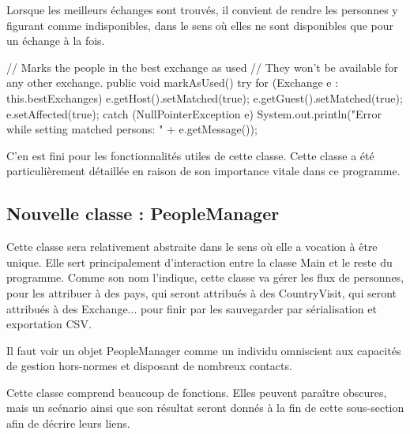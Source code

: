 \documentclass{mytex}
\begin{document}




Lorsque les meilleurs échanges sont trouvés, il convient de rendre les personnes y figurant comme indisponibles, dans le sens où elles ne sont disponibles que pour un échange à la fois.

\begin{codebox}
// Marks the people in the best exchange as used
// They won't be available for any other exchange.
public void markAsUsed() {
	try {
		for (Exchange e : this.bestExchanges) {
			e.getHost().setMatched(true);
			e.getGuest().setMatched(true);
			e.setAffected(true);
		}
	} catch (NullPointerException e) {
		System.out.println("Error while setting matched persons: " + e.getMessage());
	}
}
\end{codebox}

C'en est fini pour les fonctionnalités utiles de cette classe. Cette classe a été particulièrement détaillée en raison de son importance vitale dans ce programme.

\subsection{Nouvelle classe : PeopleManager}

Cette classe sera relativement abstraite dans le sens où elle a vocation à être unique. Elle sert principalement d'interaction entre la classe Main et le reste du programme. Comme son nom l'indique, cette classe va gérer les flux de personnes, pour les attribuer à des pays, qui seront attribués à des CountryVisit, qui seront attribués à des Exchange... pour finir par les sauvegarder par sérialisation et exportation CSV.

Il faut voir un objet PeopleManager comme un individu omniscient aux capacités de gestion hors-normes et disposant de nombreux contacts.

Cette classe comprend beaucoup de fonctions. Elles peuvent paraître obscures, mais un scénario ainsi que son résultat seront donnés à la fin de cette sous-section afin de décrire leurs liens.

\end{document}
